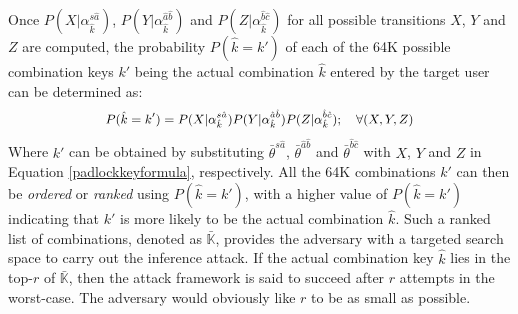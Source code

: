 \documentclass[]{IEEEtran}
\begin{document}
Once $P(X|\alpha^{s\hat{a}}_{\hat{k}})$, $P(Y|\alpha^{\hat{a}\hat{b}}_{\hat{k}})$ and $P(Z|\alpha^{\hat{b}\hat{c}}_{\hat{k}})$ for all possible transitions $X$, $Y$ and $Z$ are computed, the probability $P(\hat{k}=k')$ of each of the 64K possible combination keys $k'$ being the actual combination $\hat{k}$ entered by the target user can be determined as: 
\begin{equation}
\small
\begin{aligned}
P(\hat{k}=k') = P(X|\alpha^{s\hat{a}}_{\hat{k}}) P(Y|\alpha^{\hat{a}\hat{b}}_{\hat{k}}) P(Z|\alpha^{\hat{b}\hat{c}}_{\hat{k}}); \quad
\forall{(X,Y,Z)}
\end{aligned}
\label{combinedprobpadlock}
\end{equation}
Where $k'$ can be obtained by substituting $\bar{\theta}^{s\hat{a}}$, $\bar{\theta}^{\hat{a}\hat{b}}$ and $\bar{\theta}^{\hat{b}\hat{c}}$ with $X$, $Y$ and $Z$ in Equation \ref{padlockkeyformula}, respectively. All the 64K combinations $k'$ can then be \emph{ordered} or \emph{ranked} using $P(\hat{k}=k')$, with a higher value of $P(\hat{k}=k')$ indicating that $k'$ is more likely to be the actual combination $\hat{k}$. Such a ranked list of combinations, denoted as $\mathbb{\bar{K}}$, provides the adversary with a targeted search space to carry out the inference attack. If the actual combination key $\hat{k}$ lies in the top-$r$ of $\mathbb{\bar{K}}$, then the attack framework is said to succeed after $r$ attempts in the worst-case. The adversary would obviously like $r$ to be as small as possible.
\end{document}
